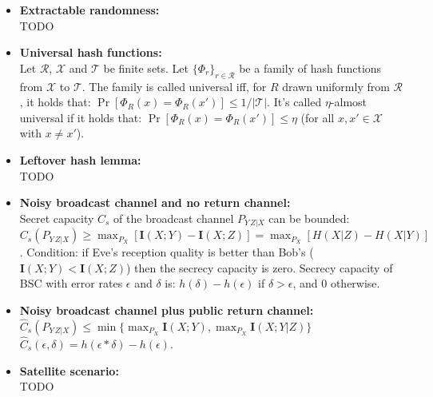 \documentclass[twocolumn,9pt]{extarticle}
\begin{document}
\begin{itemize}
	\item \textbf{Extractable randomness:}\\
	TODO

	\item \textbf{Universal hash functions:} \\
	Let $\mathcal{R}$, $\mathcal{X}$ and $\mathcal{T}$ be finite sets. Let $\{\Phi_r\}_{r \in \mathcal{R}}$ be a family of hash functions from $\mathcal{X}$ to $\mathcal{T}$. The family is called universal iff, for $R$ drawn uniformly from $\mathcal{R}$, it holds that: $\Pr[\Phi_R(x) = \Phi_R(x')] \leq 1/|\mathcal{T}|$. It's called $\eta$-almost universal if it holds that: $\Pr[\Phi_R(x) = \Phi_R(x')] \leq \eta$ (for all $x, x' \in \mathcal{X}$ with $x \neq x'$).

	\item \textbf{Leftover hash lemma: } \\
	TODO

	\item \textbf{Noisy broadcast channel and no return channel: } \\
	Secret capacity $C_s$ of the broadcast channel $P_{Y\,Z|X}$ can be bounded:\\
	$C_s(P_{Y\,Z|X}) \geq \max_{P_X}[\mathbf{I}(X;Y) - \mathbf{I}(X;Z)] = \max_{P_X}[H(X|Z) - H(X|Y)]$. Condition: if Eve's reception quality is better than Bob's ($\mathbf{I}(X;Y) < \mathbf{I}(X;Z)$) then the secrecy capacity is zero. Secrecy capacity of BSC with error rates $\epsilon$ and $\delta$ is: $h(\delta) - h(\epsilon)$ if $\delta > \epsilon$, and $0$ otherwise.

	\item \textbf{Noisy broadcast channel plus public return channel:} \\
	$\hat{C}_s(P_{Y\,Z|X}) \leq \min\{\max_{P_X}\mathbf{I}(X;Y), \max_{P_X}\mathbf{I}(X;Y|Z)\}$\\
	$\hat{C}_s(\epsilon,\delta) = h(\epsilon * \delta) - h(\epsilon)$.

	\item \textbf{Satellite scenario: } \\
	TODO


\end{itemize}
\end{document}

